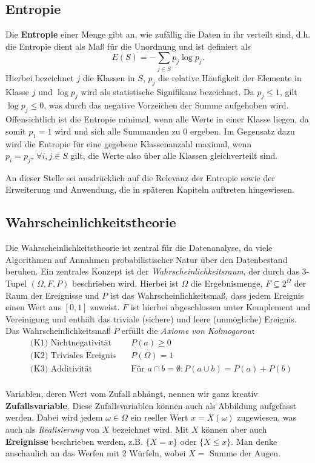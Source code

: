 \subsection{Entropie}
Die \textbf{Entropie} einer Menge gibt an, wie zufällig die Daten in ihr verteilt sind, d.h. die Entropie dient als Maß für die Unordnung und ist definiert als
\[
	E(S)=-\sum\limits_{j\in S} p_j \log{p_j}.
\]
Hierbei bezeichnet \(j\) die Klassen in \(S\), \(p_j\) die relative Häufigkeit der Elemente in Klasse \(j\) und \(\log{p_j}\) wird als statistische Signifikanz bezeichnet. Da \(p_j \leq 1 \), gilt \(\log{p_j} \leq 0\), was durch das negative Vorzeichen der Summe aufgehoben wird. Offensichtlich ist die Entropie minimal, wenn alle Werte in einer Klasse liegen, da somit \(p_1 = 1\) wird und sich alle Summanden zu \(0\) ergeben. Im Gegensatz dazu wird die Entropie für eine gegebene Klassenanzahl maximal, wenn \(p_i = p_j,\ \forall i,j\in S\) gilt, die Werte also über alle Klassen gleichverteilt sind. 

An dieser Stelle sei ausdrücklich auf die Relevanz der Entropie sowie der
Erweiterung und Anwendung, die in späteren Kapiteln auftreten hingewiesen.

\subsection{Wahrscheinlichkeitstheorie}
Die Wahrscheinlichkeitstheorie ist zentral für die Datenanalyse, da viele
Algorithmen auf Annahmen probabilistischer Natur über den Datenbestand beruhen.
Ein zentrales Konzept ist der \textit{Wahrscheinlichkeitsraum}, der durch das
3-Tupel \((\Omega, F, P)\) beschrieben wird. Hierbei ist \(\Omega\) die
Ergebnismenge, \(F\subseteq 2^{\Omega}\) der Raum der Ereignisse und \(P\) ist
das Wahrscheinlichkeitsmaß, dass jedem Ereignis einen Wert aus \([0,1]\) zuweist.
\(F\) ist hierbei abgeschlossen unter Komplement und Vereinigung und enthält
das triviale (sichere) und leere (unmögliche) Ereignis. Das
Wahrscheinlichkeitsmaß \(P\) erfüllt die \textit{Axiome von Kolmogorow}:
\begin{align*}
	&\text{(K1) Nichtnegativität}	&\quad P(a)\geq 0\\
	&\text{(K2) Triviales Ereignis}	&\quad P(\Omega) = 1\\
	&\text{(K3) Additivität}	&\quad \text{Für } a\cap b = \emptyset: P(a\cup b) = P(a) + P(b)\\
\end{align*}

\noindent Variablen, deren Wert vom Zufall abhängt, nennen wir ganz kreativ \textbf{Zufallsvariable}. Diese Zufallsvariablen können auch als Abbildung aufgefasst werden. Dabei wird jedem \(\omega \in \Omega\) ein reeller Wert \(x = X(\omega)\) zugewiesen, was auch als \textit{Realisierung} von \(X\) bezeichnet wird. Mit \(X\) können aber auch \textbf{Ereignisse} beschrieben werden, z.B. \(\{X = x\}\) oder \(\{X \leq x\}\). Man denke anschaulich an das Werfen mit 2 Würfeln, wobei \(X = \text{ Summe der Augen}\).

